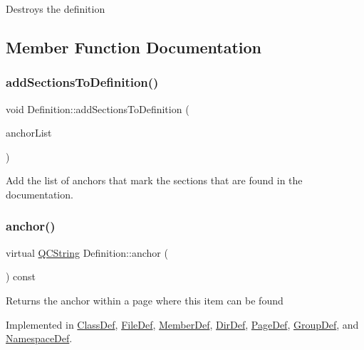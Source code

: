 Destroys the definition 

\subsection{Member Function Documentation}
\mbox{\label{class_definition_a2314524366e46c9d0cd8bcb528d6238d}} 
\subsubsection{\texorpdfstring{addSectionsToDefinition()}{addSectionsToDefinition()}}
{\footnotesize\ttfamily void Definition\+::add\+Sections\+To\+Definition (\begin{DoxyParamCaption}\item[{\mbox{\hyperlink{class_q_list}{Q\+List}}$<$ \mbox{\hyperlink{struct_section_info}{Section\+Info}} $>$ $\ast$}]{anchor\+List }\end{DoxyParamCaption})}

Add the list of anchors that mark the sections that are found in the documentation. \mbox{\label{class_definition_a56e91f9b76f41208a22cfb2336871604}} 
\subsubsection{\texorpdfstring{anchor()}{anchor()}}
{\footnotesize\ttfamily virtual \mbox{\hyperlink{class_q_c_string}{Q\+C\+String}} Definition\+::anchor (\begin{DoxyParamCaption}{ }\end{DoxyParamCaption}) const\hspace{0.3cm}{\ttfamily [pure virtual]}}

Returns the anchor within a page where this item can be found 

Implemented in \mbox{\hyperlink{class_class_def_af865817aabca93db5792b247ca8dfba6}{Class\+Def}}, \mbox{\hyperlink{class_file_def_a793b9b4a7196fd94226d4fab0a27a12d}{File\+Def}}, \mbox{\hyperlink{class_member_def_a1ef7c726fdd0f1dd2d006782dd6f766a}{Member\+Def}}, \mbox{\hyperlink{class_dir_def_ac28d85c84dbb71901ca49263f65dbdec}{Dir\+Def}}, \mbox{\hyperlink{class_page_def_a1de6c2c0acdb782e053af47271fb0a3d}{Page\+Def}}, \mbox{\hyperlink{class_group_def_a924c6e5a6fe495d70383ddc751704095}{Group\+Def}}, and \mbox{\hyperlink{class_namespace_def_ad315129c7f091c2cec0d611a592d98a2}{Namespace\+Def}}.

